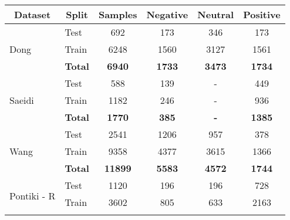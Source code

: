 \documentclass[../../fyp.tex]{subfiles}
\begin{document}
\begin{table}
	\centering
	\begin{tabular}{|l|l|c|ccc|}
		\hline
		\multicolumn{1}{|c|}{\textbf{Dataset}} & \multicolumn{1}{c|}{\textbf{Split}} & \textbf{Samples} & \textbf{Negative} & \textbf{Neutral} & \textbf{Positive} \\ \hline\hline
		\multirow{3}{*}{Dong}                  & Test                                & 692              & 173               & 346              & 173               \\
		                                       & Train                               & 6248             & 1560              & 3127             & 1561              \\ \cline{2-6}
		                                       & \textbf{Total}                      & \textbf{6940}    & \textbf{1733}     & \textbf{3473}    & \textbf{1734}     \\ \hline\hline
		\multirow{3}{*}{Saeidi}                & Test                                & 588              & 139               & -                & 449               \\
		                                       & Train                               & 1182             & 246               & -                & 936               \\ \cline{2-6}
		                                       & \textbf{Total}                      & \textbf{1770}    & \textbf{385}      & \textbf{-}       & \textbf{1385}     \\ \hline\hline
		\multirow{3}{*}{Wang}                  & Test                                & 2541             & 1206              & 957              & 378               \\
		                                       & Train                               & 9358             & 4377              & 3615             & 1366              \\ \cline{2-6}
		                                       & \textbf{Total}                      & \textbf{11899}   & \textbf{5583}     & \textbf{4572}    & \textbf{1744}     \\ \hline\hline
		\multirow{3}{*}{Pontiki - R}           & Test                                & 1120             & 196               & 196              & 728               \\
		                                       & Train                               & 3602             & 805               & 633              & 2163              \\ \cline{2-6}

\end{tabular}
\end{table}
\end{document}
